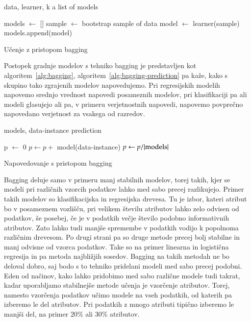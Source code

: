 \begin{algorithm}
  \begin{algorithmic}
    \REQUIRE data, learner, k
    \ENSURE a list of models
    
  \STATE models $\leftarrow$ []
  \STATE sample $\leftarrow$ bootstrap sample of data
  \STATE model $\leftarrow$ learner(sample)
  \STATE models.append(model)
  \ENDFOR
\end{algorithmic}
\caption{Učenje z pristopom bagging}
\label{alg:bagging}
\end{algorithm}

Postopek gradnje modelov s tehniko bagging je predstavljen kot algoritem~\ref{alg:bagging}, algoritem~\ref{alg:bagging-prediction} pa kaže, kako s skupino tako zgrajenih modelov napovedujemo. Pri regresijskih modelih napovemo srednjo vrednost napovedi posameznih modelov, pri klasifikaciji pa ali modeli glasujejo ali pa, v primeru verjetnostnih napovedi, napovemo povprečno napovedano verjetnost za vsakega od razredov.

\begin{algorithm}
  \begin{algorithmic}
    \REQUIRE models, data-instance
    \ENSURE prediction
    
  \STATE p $\leftarrow$ 0
  \STATE $p\leftarrow p+$ model(data-instance)
  \ENDFOR
  \STATE $p\leftarrow p/|{\rm models}|$
\end{algorithmic}
\caption{Napovedovanje s pristopom bagging}
\label{alg:bagging-prediction}
\end{algorithm}

Bagging deluje samo v primeru manj stabilnih modelov, torej takih, kjer se modeli pri različnih vzorcih podatkov lahko med sabo precej razlikujejo. Primer takih modelov so klasifikacijska in regresijska drevesa. Tu je izbor, kateri atribut bo v posameznem vozlišču, pri velikem številu atributov lahko zelo odvisen od podatkov, še posebej, če je v podatkih večje število podobno informativnih atributov. Zato lahko tudi manjše spremembe v podatkih vodijo k popolnoma različnim drevesom. Po drugi strani pa so druge metode precej bolj stabilne in manj odvisne od vzorca podatkov. Take so na primer linearna in logistična regresija in pa metoda najbližjih sosedov. Bagging na takih metodah ne bo deloval dobro, saj bodo s to tehniko pridelani modeli med sabo precej podobni. Eden od načinov, kako lahko pridobimo med sabo različne modele tudi takrat, kadar uporabljamo stabilnejše metode učenja je vzorčenje atributov. Torej, namesto vzorčenja podatkov učimo modele na vseh podatkih, od katerih pa izberemo le del atributov. Pri podatkih z mnogo atributi tipično izberemo le manjši del, na primer 20\% ali 30\% atributov.

